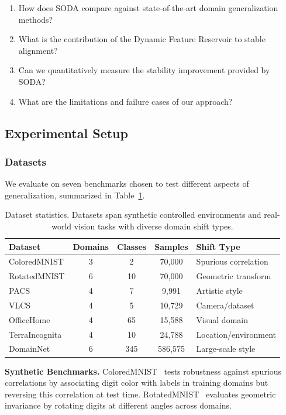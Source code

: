 \documentclass[preprint,12pt]{elsarticle}
\begin{document}
\begin{enumerate}
    \item How does SODA compare against state-of-the-art domain generalization methods?
    \item What is the contribution of the Dynamic Feature Reservoir to stable alignment?
    \item Can we quantitatively measure the stability improvement provided by SODA?
    \item What are the limitations and failure cases of our approach?
\end{enumerate}

\subsection{Experimental Setup}
\label{ssec:setup}

\subsubsection{Datasets}

We evaluate on seven benchmarks chosen to test different aspects of generalization, summarized in Table~\ref{tab:datasets}.

\begin{table}[t]
\caption{Dataset statistics. Datasets span synthetic controlled environments and real-world vision tasks with diverse domain shift types.}
\label{tab:datasets}
\centering
\small
\begin{tabular}{lcccl}
\toprule
\textbf{Dataset} & \textbf{Domains} & \textbf{Classes} & \textbf{Samples} & \textbf{Shift Type} \\
\midrule
ColoredMNIST & 3 & 2 & 70,000 & Spurious correlation \\
RotatedMNIST & 6 & 10 & 70,000 & Geometric transform \\
PACS & 4 & 7 & 9,991 & Artistic style \\
VLCS & 4 & 5 & 10,729 & Camera/dataset \\
OfficeHome & 4 & 65 & 15,588 & Visual domain \\
TerraIncognita & 4 & 10 & 24,788 & Location/environment \\
DomainNet & 6 & 345 & 586,575 & Large-scale style \\
\bottomrule
\end{tabular}
\end{table}

\textbf{Synthetic Benchmarks.} ColoredMNIST~\citep{arjovsky2019invariant} tests robustness against spurious correlations by associating digit color with labels in training domains but reversing this correlation at test time. RotatedMNIST~\citep{ghifary2015domain} evaluates geometric invariance by rotating digits at different angles across domains.
\end{document}
